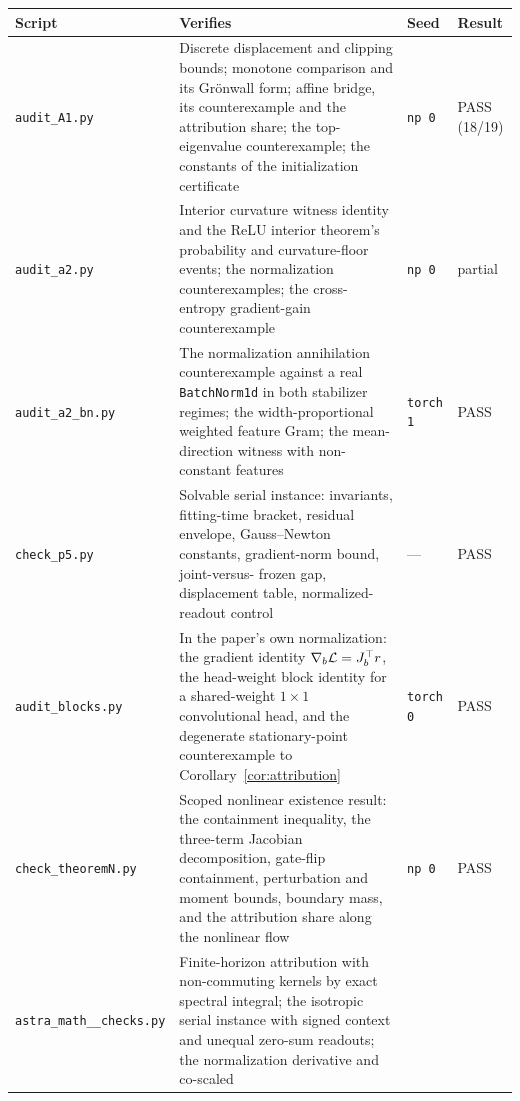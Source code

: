 \newcommand{\uscore}{\_\allowbreak}
\begin{table}[ht]
\centering
\small
\begin{tabular}{@{}p{}p{}p{}p{}@{}}
\toprule
Script & Verifies & Seed & Result \\
\midrule
\texttt{audit\uscore A1.py}
  & Discrete displacement and clipping bounds; monotone comparison and its
    Gr\"onwall form; affine bridge, its counterexample and the attribution
    share; the top-eigenvalue counterexample; the constants of the
    initialization certificate
  & \texttt{np 0} & PASS (18/19) \\
\texttt{audit\uscore a2.py}
  & Interior curvature witness identity and the ReLU interior theorem's
    probability and curvature-floor events; the normalization
    counterexamples; the cross-entropy gradient-gain counterexample
  & \texttt{np 0} & partial \\
\texttt{audit\uscore a2\uscore bn.py}
  & The normalization annihilation counterexample against a real
    \texttt{BatchNorm1d} in both stabilizer regimes; the width-proportional
    weighted feature Gram; the mean-direction witness with non-constant
    features
  & \texttt{torch 1} & PASS \\
\texttt{check\uscore p5.py}
  & Solvable serial instance: invariants, fitting-time bracket, residual
    envelope, Gauss--Newton constants, gradient-norm bound, joint-versus-%
    frozen gap, displacement table, normalized-readout control
  & --- & PASS \\
\texttt{audit\uscore blocks.py}
  & In the paper's own normalization: the gradient identity
    $\nabla_b\mathcal{L} = J_b^\top r$, the head-weight block identity for a
    shared-weight $1{\times}1$ convolutional head, and the degenerate
    stationary-point counterexample to Corollary~\ref{cor:attribution}
  & \texttt{torch 0} & PASS \\
\texttt{check\uscore theoremN.py}
  & Scoped nonlinear existence result: the containment inequality, the
    three-term Jacobian decomposition, gate-flip containment, perturbation
    and moment bounds, boundary mass, and the attribution share along the
    nonlinear flow
  & \texttt{np 0} & PASS \\
\texttt{astra\uscore math\uscore 02\uscore checks.py}
  & Finite-horizon attribution with non-commuting kernels by exact spectral
    integral; the isotropic serial instance with signed context and unequal
    zero-sum readouts; the normalization derivative and co-scaled

\end{tabular}
\end{table}
